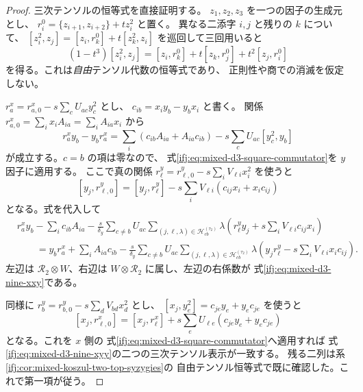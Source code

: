 \begin{proof}
三次テンソルの恒等式を直接証明する。
$z_1,z_2,z_3$ を一つの因子の生成元とし、
$r_i^0=\{z_{i+1},z_{i+2}\}+t z_i^2$ と置く。
異なる二添字 $i,j$ と残りの $k$ について、
$[z_i^2,z_j]=[z_i,r_k^0]+t[z_k^2,z_i]$ を巡回して三回用いると
\begin{equation}\label{ifj:eq:mixed-d3-square-commutator}
 (1-t^3)[z_i^2,z_j]
   =[z_i,r_k^0]+t[z_k,r_j^0]+t^2[z_j,r_i^0]
\end{equation}
を得る。これは\emph{自由}テンソル代数の恒等式であり、
正則性や商での消滅を仮定しない。

$r_a^x=r_{a,0}^x-s\sum_cU_{ac}y_c^2$ とし、
$c_{ib}=x_iy_b-y_bx_i$ と書く。
関係 $r_{a,0}^x=\sum_i x_iA_{ia}=\sum_iA_{ia}x_i$ から
\[
 r_a^xy_b-y_br_a^x
  =\sum_i(c_{ib}A_{ia}+A_{ia}c_{ib})
                        -s\sum_cU_{ac}[y_c^2,y_b]
\]
が成立する。$c=b$ の項は零なので、
式\eqref{ifj:eq:mixed-d3-square-commutator}を $y$ 因子に適用する。
ここで真の関係
$r_\ell^y=r_{\ell,0}^y-s\sum_iV_{\ell i}x_i^2$ を使うと
\[
 [y_j,r_{\ell,0}^y]
 =[y_j,r_\ell^y]
       -s\sum_iV_{\ell i}(c_{ij}x_i+x_ic_{ij})
\]
となる。式を代入して
\[
 \begin{split}
 &r_a^xy_b-\sum_i c_{ib}A_{ia}
 -\frac{s}{\delta_y}\sum_{c\ne b}U_{ac}
  \sum_{(j,\ell,\lambda)\in\mathcal H^{(\tau_2)}_{cb}}
 \lambda\left(r_\ell^yy_j+s\sum_iV_{\ell i}c_{ij}x_i\right)\\
 &\qquad=
 y_br_a^x+\sum_i A_{ia}c_{ib}
 -\frac{s}{\delta_y}\sum_{c\ne b}U_{ac}
  \sum_{(j,\ell,\lambda)\in\mathcal H^{(\tau_2)}_{cb}}
 \lambda\left(y_jr_\ell^y-s\sum_iV_{\ell i}x_ic_{ij}\right).
 \end{split}
\]
左辺は $\mathcal R_2\otimes W$、右辺は
$W\otimes\mathcal R_2$ に属し、左辺の右係数が
式\eqref{ifj:eq:mixed-d3-nine-xxy}である。

同様に $r_b^y=r_{b,0}^y-s\sum_dV_{bd}x_d^2$ とし、
$[x_j,y_e^2]=c_{je}y_e+y_ec_{je}$ を使うと
\[
 [x_j,r_{\ell,0}^x]
 =[x_j,r_\ell^x]
       +s\sum_eU_{\ell e}(c_{je}y_e+y_ec_{je})
\]
となる。これを $x$ 側の
式\eqref{ifj:eq:mixed-d3-square-commutator}へ適用すれば
式\eqref{ifj:eq:mixed-d3-nine-xyy}の二つの三次テンソル表示が一致する。
残る二列は系\ref{ifj:cor:mixed-koszul-two-top-syzygies}の
自由テンソル恒等式で既に確認した。これで第一項が従う。


\end{proof}
